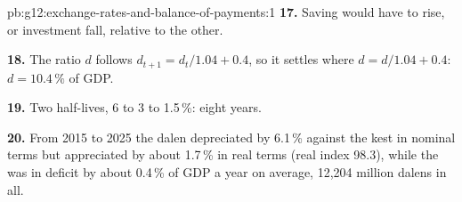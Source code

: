 \begin{solution}{pb:g12:exchange-rates-and-balance-of-payments:1}
\textbf{17.} Saving would have to rise, or investment fall, relative to the other.

\textbf{18.} The ratio $d$ follows $d_{t+1} = d_t/1.04 + 0.4$, so it settles where $d = d/1.04 + 0.4$: $d = 10.4\,\%$ of GDP.

\textbf{19.} Two half-lives, 6 to 3 to 1.5\,\%: eight years.

\textbf{20.} From 2015 to 2025 the dalen depreciated by 6.1\,\% against the kest in nominal terms but appreciated by about 1.7\,\% in real terms (real index 98.3), while the  was in deficit by about 0.4\,\% of GDP a year on average, 12,204 million dalens in all.
\end{solution}
